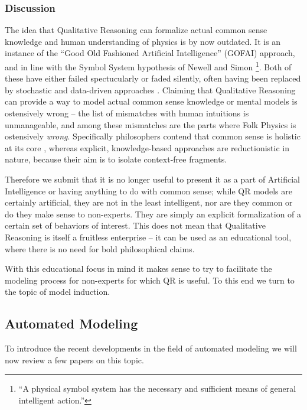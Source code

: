 \documentclass{article} %
\begin{document}
\subsubsection{Discussion}
\label{sec:litrev_qr_discussion}
The idea that Qualitative Reasoning can formalize actual common sense knowledge
and human understanding of physics is by now outdated. It is an instance of the
``Good Old Fashioned Artificial Intelligence'' (GOFAI) approach,
\cite{haugeland} and in line with the Symbol System hypothesis of Newell and
Simon \cite{newell}\footnote{``A physical symbol system has the necessary and
sufficient means of general intelligent action.''}.  Both of these have either
failed spectucularly or faded silently, often having been replaced by
stochastic and data-driven approaches \cite{russellnorvig}.  Claiming that
Qualitative Reasoning can provide a way to model actual common sense knowledge
or mental models is ostensively wrong -- the list of mismatches with human
intuitions is unmanageable, and among these mismatches are the parts where Folk
Physics is ostensively {\em wrong}. Specifically philosophers contend that
common sense is holistic at its core \cite{smith}, whereas explicit,
knowledge-based approaches are reductionistic in nature, because their aim is
to isolate context-free fragments. 

Therefore we submit that it is no longer useful to present it as a part of
Artificial Intelligence or having anything to do with common sense; while QR
models are certainly artificial, they are not in the least intelligent, nor are
they common or do they make sense to non-experts.  They are simply an explicit
formalization of a certain set of behaviors of interest. This does not mean
that Qualitative Reasoning is itself a fruitless enterprise -- it can be used
as an educational tool, where there is no need for bold philosophical claims.

With this educational focus in mind it makes sense to try to facilitate the
modeling process for non-experts for which QR is useful. To this end we turn
to the topic of model induction.

\subsection{Automated Modeling} %
\label{sec:litrev_am}
To introduce the recent developments in the field of automated modeling we
will now review a few papers on this topic.
\end{document}
